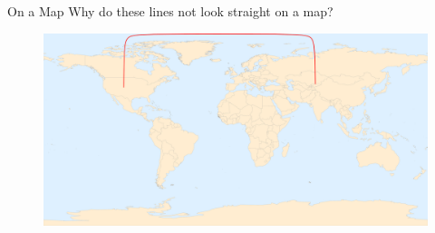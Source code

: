 \documentclass[UKenglish]{beamer}
\begin{document}
\begin{frame}{On a Map}
Why do these lines not look straight on a map?
    \begin{figure}[H]
        \centering
        \includegraphics[width=.9\textwidth]{Figures/mercator_two_cities.pdf}
    \end{figure}
\end{frame}
\end{document}
